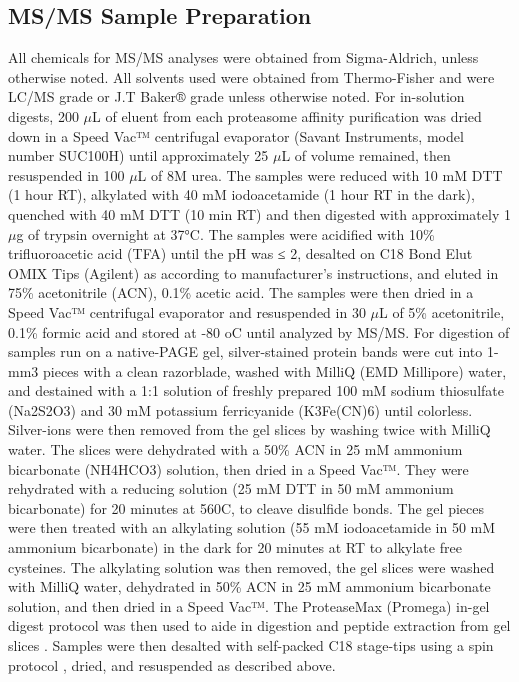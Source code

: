 \subsection{MS/MS Sample Preparation}
	All chemicals for MS/MS analyses were obtained from Sigma-Aldrich, unless otherwise noted. All solvents used were obtained from Thermo-Fisher and were LC/MS grade or J.T Baker® grade unless otherwise noted. For in-solution digests, 200 $\mu$L of eluent from each proteasome affinity purification was dried down in a Speed Vac™ centrifugal evaporator (Savant Instruments, model number SUC100H) until approximately 25 $\mu$L of volume remained, then resuspended in 100 $\mu$L of 8M urea. The samples were reduced with 10 mM DTT (1 hour RT), alkylated with 40 mM iodoacetamide (1 hour RT in the dark), quenched with 40 mM DTT (10 min RT) and then digested with approximately 1 $\mu$g of trypsin overnight at 37°C. The samples were acidified with 10\% trifluoroacetic acid (TFA) until the pH was ≤ 2, desalted on C18 Bond Elut OMIX Tips (Agilent) as according to manufacturer’s instructions, and eluted in 75\% acetonitrile (ACN), 0.1\% acetic acid. The samples were then dried in a Speed Vac™ centrifugal evaporator and resuspended in 30 $\mu$L of 5\% acetonitrile, 0.1\% formic acid and stored at -80 oC until analyzed by MS/MS. 
For digestion of samples run on a native-PAGE gel, silver-stained protein bands were cut into 1-mm3 pieces with a clean razorblade, washed with MilliQ (EMD Millipore) water, and destained with a 1:1 solution of freshly prepared 100 mM sodium thiosulfate (Na2S2O3) and 30 mM potassium ferricyanide (K3Fe(CN)6) until colorless. Silver-ions were then removed from the gel slices by washing twice with MilliQ water. The slices were dehydrated with a 50\% ACN in 25 mM ammonium bicarbonate (NH4HCO3) solution, then dried in a Speed Vac™. They were rehydrated with a reducing solution (25 mM DTT in 50 mM ammonium bicarbonate) for 20 minutes at 560C, to cleave disulfide bonds. The gel pieces were then treated with an alkylating solution (55 mM iodoacetamide in 50 mM ammonium bicarbonate) in the dark for 20 minutes at RT to alkylate free cysteines. The alkylating solution was then removed, the gel slices were washed with MilliQ water, dehydrated in 50\% ACN in 25 mM ammonium bicarbonate solution, and then dried in a Speed Vac™. The ProteaseMax (Promega) in-gel digest protocol was then used to aide in digestion and peptide extraction from gel slices \citep{saveliev13}. Samples were then desalted with self-packed C18 stage-tips \citep{rappsilber03} using a spin protocol \citep{yu14} , dried, and resuspended as described above.
